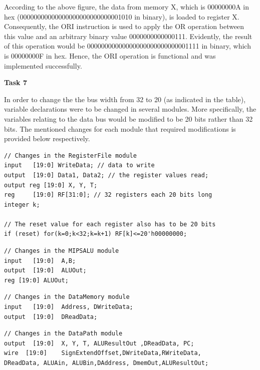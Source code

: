 \documentclass[12pt,a4paper]{article}
\begin{document}
	\noindent According to the above figure, the data from memory X, which is 00000000A in hex (00000000000000000000000000001010 in binary), is loaded to register X. Consequently, the ORI instruction is used to apply the OR operation between this value and an arbitrary binary value 0000000000000111. Evidently, the result of this operation would be 00000000000000000000000000001111 in binary, which is 00000000F in hex. Hence, the ORI operation is functional and was implemented successfully. 
	
	\newpage
	\noindent \textbf{\large Task 7}
	\vspace{0.2cm}
	
	\noindent In order to change the the bus width from 32 to 20 (as indicated in the table), variable declarations were to be changed in several modules. More specifically, the variables relating to the data bus would be modified to be 20 bits rather than 32 bits. The mentioned changes for each module that required modifications is provided below respectively.
	
		\vspace{-0.4cm}
	\begin{lstlisting}[style={verilog-style}]
// Changes in the RegisterFile module
input 	[19:0] WriteData; // data to write
output 	[19:0] Data1, Data2; // the register values read;
output reg [19:0] X, Y, T;
reg 	[19:0] RF[31:0]; // 32 registers each 20 bits long
integer	k;
	
// The reset value for each register also has to be 20 bits
if (reset) for(k=0;k<32;k=k+1) RF[k]<=20'h00000000;
	\end{lstlisting}
	
		\vspace{-0.4cm}
	
	\begin{lstlisting}[style={verilog-style}]
// Changes in the MIPSALU module
input	[19:0] 	A,B;
output	[19:0] 	ALUOut;
reg	[19:0] ALUOut;
\end{lstlisting}
	\vspace{-0.4cm}

	\begin{lstlisting}[style={verilog-style}]
// Changes in the DataMemory module
input 	[19:0] 	Address, DWriteData;
output 	[19:0]	DReadData;
\end{lstlisting}
	\vspace{-0.4cm}

	\begin{lstlisting}[style={verilog-style}]
// Changes in the DataPath module
output	[19:0]	X, Y, T, ALUResultOut ,DReadData, PC;
wire  [19:0] 	SignExtendOffset,DWriteData,RWriteData, 
DReadData, ALUAin, ALUBin,DAddress, DmemOut,ALUResultOut;
\end{lstlisting}
	\vspace{-0.4cm}
\end{document}
